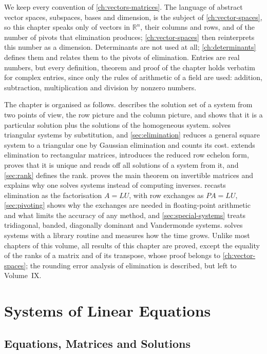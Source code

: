 We keep every convention of \cref{ch:vectors-matrices}. The language of abstract vector spaces, subspaces, bases and dimension, is the subject of \cref{ch:vector-spaces}, so this chapter speaks only of vectors in $\mathbb R^n$, their columns and rows, and of the number of pivots that elimination produces; \cref{ch:vector-spaces} then reinterprets this number as a dimension. Determinants are not used at all; \cref{ch:determinants} defines them and relates them to the pivots of elimination. Entries are real numbers, but every definition, theorem and proof of the chapter holds verbatim for complex entries, since only the rules of arithmetic of a field are used: addition, subtraction, multiplication and division by nonzero numbers.

The chapter is organised as follows.  describes the solution set of a system from two points of view, the row picture and the column picture, and shows that it is a particular solution plus the solutions of the homogeneous system.  solves triangular systems by substitution, and \cref{sec:elimination} reduces a general square system to a triangular one by Gaussian elimination and counts its cost.  extends elimination to rectangular matrices, introduces the reduced row echelon form, proves that it is unique and reads off all solutions of a system from it, and \cref{sec:rank} defines the rank.  proves the main theorem on invertible matrices and explains why one solves systems instead of computing inverses.  recasts elimination as the factorisation $A=LU$, with row exchanges as $PA=LU$, \cref{sec:pivoting} shows why the exchanges are needed in floating-point arithmetic and what limits the accuracy of any method, and \cref{sec:special-systems} treats tridiagonal, banded, diagonally dominant and Vandermonde systems.  solves systems with a library routine and measures how the time grows. Unlike most chapters of this volume, all results of this chapter are proved, except the equality of the ranks of a matrix and of its transpose, whose proof belongs to \cref{ch:vector-spaces}; the rounding error analysis of elimination is described, but left to Volume~IX.

\section{Systems of Linear Equations}
\label{sec:systems}

\subsection{Equations, Matrices and Solutions}

